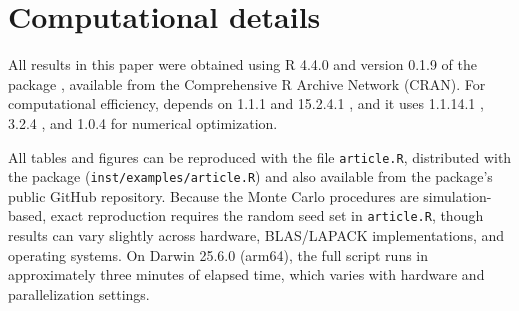 \section*{Computational details}\label{computational-details}

All results in this paper were obtained using R 4.4.0 \citep{r2024} and version 0.1.9 of the package , available from the Comprehensive R Archive Network (CRAN). For computational efficiency,  depends on  1.1.1 \citep{eddetal2018} and  15.2.4.1 \citep{eddsan2024}, and it uses  1.1.14.1 \citep{xiaetal2013},  3.2.4 \citep{scrucca2013}, and  1.0.4 \citep{psopack} for numerical optimization.

All tables and figures can be reproduced with the file \texttt{article.R}, distributed with the  package (\texttt{inst/examples/article.R}) and also available from the package's public GitHub repository. Because the Monte Carlo procedures are simulation-based, exact reproduction requires the random seed set in \texttt{article.R}, though results can vary slightly across hardware, BLAS/LAPACK implementations, and operating systems. On Darwin 25.6.0 (arm64), the full script runs in approximately three minutes of elapsed time, which varies with hardware and parallelization settings.



\address{%
Gabriel Rodriguez-Rondon\\
Bank of Canada\\%
Canadian Economic Analysis Department\\ Ottawa, ON, Canada\\
%
\url{https://grodriguezrondon.com}\\%
\textit{ORCID: \href{https://orcid.org/0009-0005-3769-9921}{0009-0005-3769-9921}}\\%
\href{mailto:grodriguezrondon@bankofcanada.ca}{\nolinkurl{grodriguezrondon@bankofcanada.ca}}%
}

\address{%
Jean-Marie Dufour\\
McGill University\\%
Department of Economics\\ Montreal, QC, Canada\\
%
\url{http://www.jeanmariedufour.com}\\%
\textit{ORCID: \href{https://orcid.org/0000-0002-7731-2278}{0000-0002-7731-2278}}\\%
\href{mailto:jean-marie.dufour@mcgill.ca}{\nolinkurl{jean-marie.dufour@mcgill.ca}}%
}
